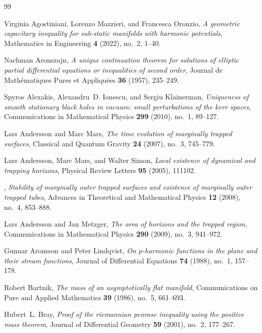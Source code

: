 \documentclass[12pt]{article}
\theoremstyle{plain}
\theoremstyle{definition}
\theoremstyle{remark}
\begin{document}
\begin{thebibliography}{99}

Virginia Agostiniani, Lorenzo Mazzieri, and Francesca Oronzio, \emph{A
  geometric capacitary inequality for sub-static manifolds with harmonic
  potentials}, Mathematics in Engineering \textbf{4} (2022), no.~2, 1--40.

Nachman Aronszajn, \emph{A unique continuation theorem for solutions of elliptic partial differential equations or inequalities of second order}, Journal de Math\'ematiques Pures et Appliqu\'ees \textbf{36} (1957), 235--249.

Spyros Alexakis, Alexandru~D. Ionescu, and Sergiu Klainerman, \emph{Uniqueness
  of smooth stationary black holes in vacuum: small perturbations of the kerr
  spaces}, Communications in Mathematical Physics \textbf{299} (2010), no.~1,
  89--127.

Lars Andersson and Marc Mars, \emph{The time evolution of marginally trapped
  surfaces}, Classical and Quantum Gravity \textbf{24} (2007), no.~3, 745--779.

Lars Andersson, Marc Mars, and Walter Simon, \emph{Local existence of dynamical
  and trapping horizons}, Physical Review Letters \textbf{95} (2005), 111102.

\bysame, \emph{Stability of marginally outer trapped surfaces and existence of
  marginally outer trapped tubes}, Advances in Theoretical and Mathematical
  Physics \textbf{12} (2008), no.~4, 853--888.

Lars Andersson and Jan Metzger, \emph{The area of horizons and the trapped
  region}, Communications in Mathematical Physics \textbf{290} (2009), no.~3,
  941--972.

Gunnar Aronsson and Peter Lindqvist, \emph{On $p$-harmonic functions in the
  plane and their stream functions}, Journal of Differential Equations
  \textbf{74} (1988), no.~1, 157--178.

Robert Bartnik, \emph{The mass of an asymptotically flat manifold},
  Communications on Pure and Applied Mathematics \textbf{39} (1986), no.~5,
  661--693.

Hubert~L. Bray, \emph{Proof of the riemannian penrose inequality using the
  positive mass theorem}, Journal of Differential Geometry \textbf{59} (2001),
  no.~2, 177--267.


\end{thebibliography}
\end{document}
